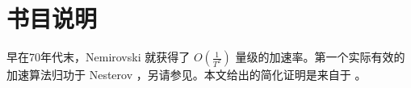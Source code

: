 \newpage
\section{
    书目说明
    }

早在70年代末，Nemirovski 就获得了 $O(\frac{1}{T^2})$ 量级的加速率。第一个实际有效的加速算法归功于 Nesterov \cite{Nesterov}，另请参见\cite{NesterovBook}。本文给出的简化证明是来自于 \cite{allen2014linear}。